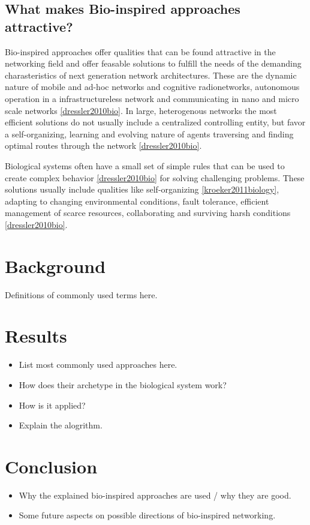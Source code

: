 \documentclass{IWORK2014}
\begin{document}
\subsection{What makes Bio-inspired approaches attractive?} 
Bio-inspired approaches offer qualities that can be found attractive in the networking field and offer feasable solutions to fulfill the needs of the demanding charasteristics of next generation network architectures. These are the dynamic nature of mobile and ad-hoc networks and cognitive radionetworks, autonomous operation in a infrastructureless network and communicating in nano and micro scale networks \ref{dressler2010bio}. In large, heterogenous networks the most efficient solutions do not usually include a centralized controlling entity, but favor a self-organizing, learning and evolving nature of agents traversing and finding optimal routes through the network \ref{dressler2010bio}.

Biological systems often have a small set of simple rules that can be used to create complex behavior \ref{dressler2010bio} for solving challenging problems. These solutions usually include qualities like self-organizing \ref{kroeker2011biology}, adapting to changing environmental conditions, fault tolerance, efficient management of scarce resources, collaborating and surviving harsh conditions \ref{dressler2010bio}.

\section{Background}
Definitions of commonly used terms here.

\section{Results}

\begin{itemize}
	\item List most commonly used approaches here.
	\item How does their archetype in the biological system work?
	\item How is it applied?
	\item Explain the alogrithm.
\end{itemize}

\section{Conclusion}
\begin{itemize}
	\item Why the explained bio-inspired approaches are used / why they are good.
	\item Some future aspects on possible directions of bio-inspired networking.
\end{itemize}




\end{document}
